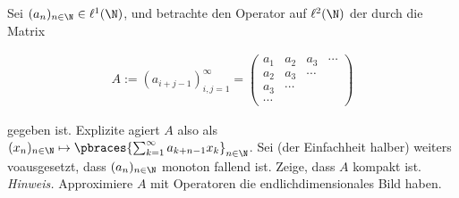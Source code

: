 \begin{exercise}[20/1]

Sei $(a_n)_{n \in \N} \in \ell^1(\N)$, und betrachte den Operator auf $\ell^2(\N)$ der durch die Matrix

\begin{align*}
  A
  :=
  (a_{i+j-1})_{i,j = 1}^\infty
  =
  \begin{pmatrix}
    a_1    & a_2    & a_3    & \cdots \\
    a_2    & a_3    & \cdots &        \\
    a_3    & \cdots &        &        \\
    \cdots &        &        &
  \end{pmatrix}
\end{align*}

gegeben ist.
Explizite agiert $A$ also als $(x_n)_{n \in \N} \mapsto \pbraces{\sum_{k=1}^\infty a_{k+n-1} x_k}_{n \in \N}$.
Sei (der Einfachheit halber) weiters voausgesetzt, dass $(a_n)_{n \in \N}$ monoton fallend ist.
Zeige, dass $A$ kompakt ist. \\

\textit{Hinweis.}
Approximiere $A$ mit Operatoren die endlichdimensionales Bild haben.

\end{exercise}

